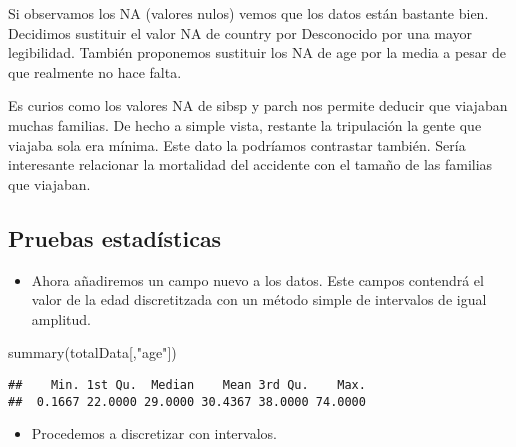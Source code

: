 \documentclass[
]{article}
\newenvironment{Shaded}{\begin{snugshade}}{\end{snugshade}}
\newcommand{\AttributeTok}[1]{\textcolor[rgb]{0.80,0.80,0.80}{#1}}
\newcommand{\DecValTok}[1]{\textcolor[rgb]{0.86,0.86,0.80}{#1}}
\newcommand{\FunctionTok}[1]{\textcolor[rgb]{0.94,0.94,0.56}{#1}}
\newcommand{\NormalTok}[1]{\textcolor[rgb]{0.80,0.80,0.80}{#1}}
\newcommand{\OtherTok}[1]{\textcolor[rgb]{0.94,0.94,0.56}{#1}}
\newcommand{\SpecialCharTok}[1]{\textcolor[rgb]{0.86,0.64,0.64}{#1}}
\newcommand{\StringTok}[1]{\textcolor[rgb]{0.80,0.58,0.58}{#1}}
\providecommand{\tightlist}{%
  \setlength{\itemsep}{0pt}\setlength{\parskip}{0pt}}
\begin{document}
Si observamos los NA (valores nulos) vemos que los datos están bastante
bien. Decidimos sustituir el valor NA de country por Desconocido por una
mayor legibilidad. También proponemos sustituir los NA de age por la
media a pesar de que realmente no hace falta.

Es curios como los valores NA de sibsp y parch nos permite deducir que
viajaban muchas familias. De hecho a simple vista, restante la
tripulación la gente que viajaba sola era mínima. Este dato la podríamos
contrastar también. Sería interesante relacionar la mortalidad del
accidente con el tamaño de las familias que viajaban.

\hypertarget{pruebas-estaduxedsticas}{%
\subsection{Pruebas estadísticas}\label{pruebas-estaduxedsticas}}

\begin{itemize}
\tightlist
\item
  Ahora añadiremos un campo nuevo a los datos. Este campos contendrá el
  valor de la edad discretitzada con un método simple de intervalos de
  igual amplitud.
\end{itemize}

\begin{Shaded}
\begin{Highlighting}[]
\FunctionTok{summary}\NormalTok{(totalData[,}\StringTok{"age"}\NormalTok{])}
\end{Highlighting}
\end{Shaded}

\begin{verbatim}
##    Min. 1st Qu.  Median    Mean 3rd Qu.    Max. 
##  0.1667 22.0000 29.0000 30.4367 38.0000 74.0000
\end{verbatim}

\begin{itemize}
\tightlist
\item
  Procedemos a discretizar con intervalos.
\end{itemize}

\begin{Shaded}
\end{Shaded}
\end{document}
